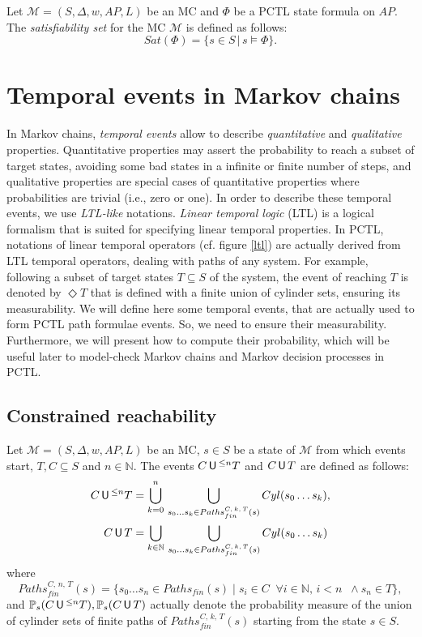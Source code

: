\begin{definition}
  Let $\mathcal{M}=(S, \Delta, w, AP, L)$ be an MC and $\Phi$ be a PCTL state formula on $AP$. The \textit{satisfiability set} for the MC $\mathcal{M}$ is defined as follows:
  \[
    Sat(\Phi) = \{ s \in S \, | \, s \models \Phi \}.
  \]
\end{definition}

\section{Temporal events in Markov chains}\label{tempevent}
In Markov chains, \textit{temporal events} allow to describe \textit{quantitative} and \textit{qualitative} properties.
Quantitative properties may assert the probability to reach a subset of target states, avoiding some bad states in a infinite or finite number of steps, and
qualitative properties are special cases of quantitative properties where probabilities are trivial (i.e., zero or one).
In order to describe these temporal events, we use \textit{LTL-like} notations.
\textit{Linear temporal logic} (LTL) is a logical formalism
that is suited for specifying linear temporal properties.
In PCTL, notations of linear temporal operators (cf. figure \ref{ltl}) are actually derived from LTL temporal operators, dealing with paths of any system.
For example, following a subset of target states $T \subseteq S$ of the system, the event of reaching $T$ is denoted by $\Diamond T$ that is defined with a finite union of cylinder sets, ensuring its measurability.
We will define here some temporal events, that are actually used to form PCTL path formulae events. So, we need to ensure their measurability.
Furthermore, we will present how to compute their probability, which will be useful later to model-check Markov chains and Markov decision processes in PCTL.
\subsection{Constrained reachability}
\begin{definition}
Let $\mathcal{M}= (S, \Delta, w, AP, L)$ be an MC, $s \in S$ be a state of $\mathcal{M}$ from which events start, $T, C \subseteq S$ and $n \in \mathbb{N}$.
The events $C \,\text{\sffamily U}\,^{\leq n} T$ and $C \,\text{\sffamily U}\, T$ are defined as follows:
\begin{align*}
  C \,\text{\sffamily U}\,^{\leq n} T &= \bigcup_{k=0}^n\,\bigcup_{s_0\dots s_k \in Paths_{fin}^{C,\, k,\, T}(s)} Cyl(s_0\dots s_k),\\
  C \,\text{\sffamily U}\, T &= \bigcup_{k\in \mathbb{N}}\,\bigcup_{s_0\dots s_k \in Paths_{fin}^{C,\, k,\, T}(s)} Cyl(s_0\dots s_k)
\end{align*}
where \[Paths_{fin}^{C,\, n,\, T}(s) = \{ s_0 \dots s_n \in Paths_{fin}(s) \; | \; s_i \in C\;\; \forall i \in \mathbb{N},\, i < n \; \; \wedge s_n \in T\},\]
and $\mathbb{P}_s(C \,\text{\sffamily U}\,^{\leq n} T), \mathbb{P}_s(C \,\text{\sffamily U}\, T)$ actually denote the probability measure of the union of cylinder sets of finite paths  of $Paths_{fin}^{C, \, k, \, T}(s)$ starting from the state $s \in S$.
\end{definition}

